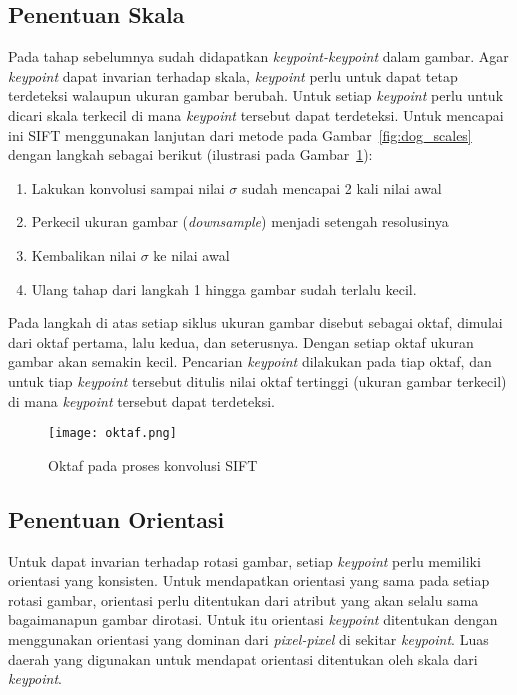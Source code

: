 \subsection{Penentuan Skala}
Pada tahap sebelumnya sudah didapatkan \textit{keypoint-keypoint} dalam gambar. Agar \textit{keypoint} dapat invarian terhadap skala, \textit{keypoint} perlu untuk dapat tetap terdeteksi walaupun ukuran gambar berubah. Untuk setiap \textit{keypoint} perlu untuk dicari skala terkecil di mana \textit{keypoint} tersebut dapat terdeteksi. Untuk mencapai ini SIFT menggunakan lanjutan dari metode pada Gambar~\ref{fig:dog_scales} dengan langkah sebagai berikut (ilustrasi pada Gambar~\ref{fig:oktaf}):
\begin{enumerate}
	\item Lakukan konvolusi sampai nilai $\sigma$ sudah mencapai 2 kali nilai awal
	\item Perkecil ukuran gambar (\textit{downsample}) menjadi setengah resolusinya
	\item Kembalikan nilai $\sigma$ ke nilai awal
	\item Ulang tahap dari langkah 1 hingga gambar sudah terlalu kecil.
\end{enumerate}

Pada langkah di atas setiap siklus ukuran gambar disebut sebagai oktaf, dimulai dari oktaf pertama, lalu kedua, dan seterusnya. Dengan setiap oktaf ukuran gambar akan semakin kecil. Pencarian \textit{keypoint} dilakukan pada tiap oktaf, dan untuk tiap \textit{keypoint} tersebut ditulis nilai oktaf tertinggi (ukuran gambar terkecil) di mana \textit{keypoint} tersebut dapat terdeteksi.

\begin{figure}[H]
	\centering
	\texttt{[image: oktaf.png]}
	\caption{Oktaf pada proses konvolusi SIFT}
	\label{fig:oktaf}
\end{figure}

\subsection{Penentuan Orientasi}
Untuk dapat invarian terhadap rotasi gambar, setiap \textit{keypoint} perlu memiliki orientasi yang konsisten. Untuk mendapatkan orientasi yang sama pada setiap rotasi gambar, orientasi perlu ditentukan dari atribut yang akan selalu sama bagaimanapun gambar dirotasi. Untuk itu orientasi \textit{keypoint} ditentukan dengan menggunakan orientasi yang dominan dari \textit{pixel-pixel} di sekitar \textit{keypoint}. Luas daerah yang digunakan untuk mendapat orientasi ditentukan oleh skala dari \textit{keypoint}. 

